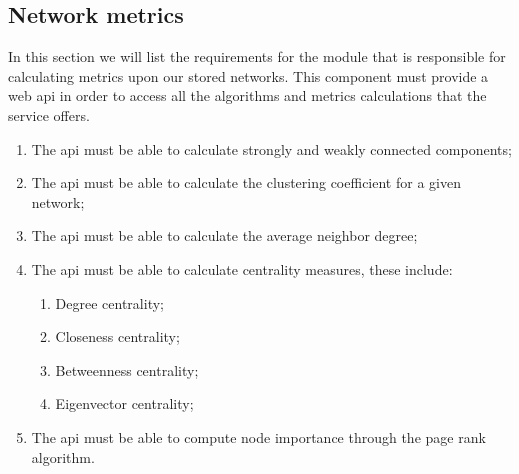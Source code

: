 \subsection{Network metrics}
\label{subsec:networkmetrics}

In this section we will list the requirements for the module that is responsible for calculating metrics upon our stored networks. This component must
provide a web \gls{api} in order to access all the algorithms and metrics calculations that the service offers.

\begin{enumerate}
    \item The \gls{api} must be able to calculate strongly and weakly connected components;
    \item The \gls{api} must be able to calculate the clustering coefficient for a given network;
    \item The \gls{api} must be able to calculate the average neighbor degree;
    \item The \gls{api} must be able to calculate centrality measures, these include:
    \begin{enumerate}
        \item Degree centrality;
        \item Closeness centrality;
        \item Betweenness centrality;
        \item Eigenvector centrality;
    \end{enumerate}
    \item The \gls{api} must be able to compute node importance through the page rank algorithm.
\end{enumerate}
